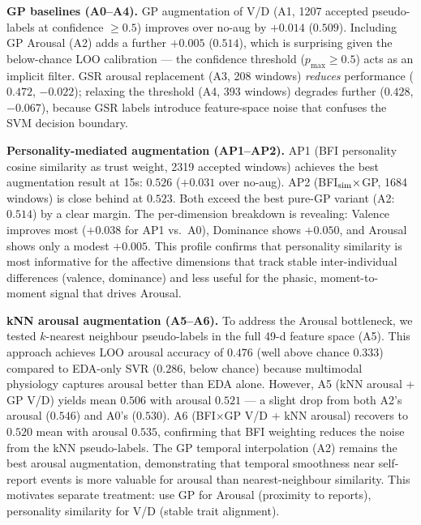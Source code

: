 \documentclass[sigconf,review,anonymous]{acmart}
\begin{document}
\textbf{GP baselines (A0--A4).}
GP augmentation of V/D (A1, 1207 accepted pseudo-labels at confidence $\geq 0.5$)
improves over no-aug by $+0.014$ ($0.509$).
Including GP Arousal (A2) adds a further $+0.005$ ($0.514$), which is
surprising given the below-chance LOO calibration --- the confidence threshold
($p_{\max} \geq 0.5$) acts as an implicit filter.
GSR arousal replacement (A3, 208 windows) \emph{reduces} performance
($0.472$, $-0.022$); relaxing the threshold (A4, 393 windows) degrades further
($0.428$, $-0.067$), because GSR labels introduce feature-space noise that
confuses the SVM decision boundary.

\textbf{Personality-mediated augmentation (AP1--AP2).}
AP1 (BFI personality cosine similarity as trust weight, 2319 accepted windows)
achieves the best augmentation result at 15s: $0.526$ ($+0.031$ over no-aug).
AP2 (BFI$_{\rm sim}\times$GP, 1684 windows) is close behind at $0.523$.
Both exceed the best pure-GP variant (A2: $0.514$) by a clear margin.
The per-dimension breakdown is revealing: Valence improves most
($+0.038$ for AP1 vs.\ A0), Dominance shows $+0.050$, and Arousal shows only
a modest $+0.005$.
This profile confirms that personality similarity is most informative for the
affective dimensions that track stable inter-individual differences (valence,
dominance) and less useful for the phasic, moment-to-moment signal that drives
Arousal.

\textbf{kNN arousal augmentation (A5--A6).}
To address the Arousal bottleneck, we tested $k$-nearest neighbour pseudo-labels
in the full 49-d feature space (A5).
This approach achieves LOO arousal accuracy of $0.476$ (well above chance $0.333$)
compared to EDA-only SVR ($0.286$, below chance) because multimodal physiology
captures arousal better than EDA alone.
However, A5 (kNN arousal + GP V/D) yields mean $0.506$ with arousal $0.521$
--- a slight drop from both A2's arousal ($0.546$) and A0's ($0.530$).
A6 (BFI$\times$GP V/D + kNN arousal) recovers to $0.520$ mean with arousal
$0.535$, confirming that BFI weighting reduces the noise from the kNN
pseudo-labels.
The GP temporal interpolation (A2) remains the best arousal augmentation,
demonstrating that temporal smoothness near self-report events is more
valuable for arousal than nearest-neighbour similarity.
This motivates separate treatment: use GP for Arousal (proximity to reports),
personality similarity for V/D (stable trait alignment).
\end{document}
